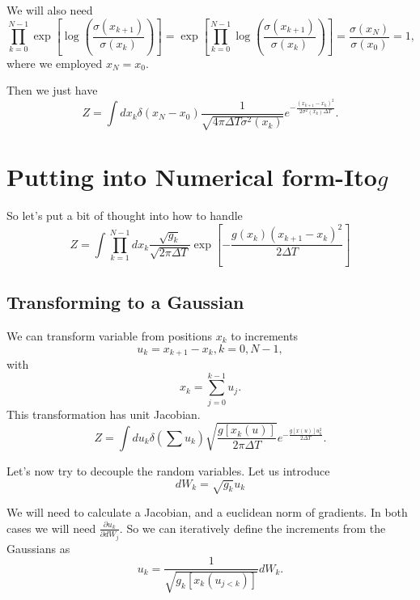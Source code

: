 We will also need
\begin{equation}
\prod_{k=0}^{N-1} \exp\left[\log\left(\frac{\sigma(x_{k+1})}{\sigma(x_k)}\right)\right] =  \exp\left[\prod_{k=0}^{N-1}\log\left(\frac{\sigma(x_{k+1})}{\sigma(x_k)}\right)\right] = \frac{\sigma(x_N)}{\sigma(x_0)} = 1,
\end{equation}
where we employed $x_N = x_0$.  

Then we just have 
\begin{equation}
Z= \int dx_k \delta(x_N-x_0)\frac{1}{\sqrt{4\pi \Delta T\sigma^2(x_{k})}} e^{-\frac{(x_{k+1}-x_{k})^2}{2\sigma^2(x_k)\Delta T}}.
\end{equation}


\section{Putting into Numerical form-Ito$g$} 

So let's put a bit of thought into how to handle 
\begin{equation}
Z = \int \prod_{k=1}^{N-1}dx_k \frac{\sqrt{g_k}}{\sqrt{2\pi\Delta T}} \exp\left[- \frac{g(x_k)(x_{k+1}-x_k)^2}{2\Delta T}\right]
\end{equation}

\subsection{Transforming to a Gaussian}
We can transform variable from positions $x_k$ to increments
\begin{equation}
u_k = x_{k+1} - x_k, k = 0,N-1,
\end{equation}
with
\begin{equation}
x_{k} = \sum_{j=0}^{k-1} u_j.
\end{equation}
This transformation has unit Jacobian.  
\begin{equation}
Z= \int du_k \delta\left(\sum u_k \right)\sqrt{\frac{g[x_k(u)]}{2\pi \Delta T}} e^{-\frac{g[x(u)]u_k^2}{2\Delta T}}.
\end{equation}

Let's now try to decouple the random variables.  Let us introduce 
\begin{equation}
dW_k = \sqrt{g_k}u_k
\end{equation}

We will need to calculate a Jacobian, and a euclidean norm of gradients.  In both cases we will need $\frac{\partial u_k}{\partial dW_j}$.  
So we can iteratively define the increments from the Gaussians as 
\begin{equation}
u_k = \frac{1}{\sqrt{g_k[x_k(u_{j<k})]}}dW_k.
\end{equation}

